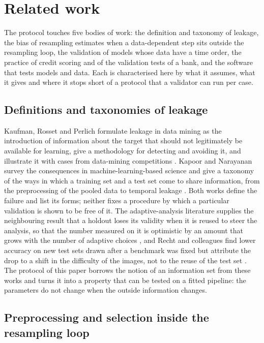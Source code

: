 \section{Related work}
\label{sec:related-work}

The protocol touches five bodies of work: the definition and taxonomy of leakage, the bias of resampling estimates when a data-dependent step sits outside the resampling loop, the validation of models whose data have a time order, the practice of credit scoring and of the validation tests of a bank, and the software that tests models and data. Each is characterised here by what it assumes, what it gives and where it stops short of a protocol that a validator can run per case.

\subsection{Definitions and taxonomies of leakage}

Kaufman, Rosset and Perlich formulate leakage in data mining as the introduction of information about the target that should not legitimately be available for learning, give a methodology for detecting and avoiding it, and illustrate it with cases from data-mining competitions \citep{kaufman2012}. Kapoor and Narayanan survey the consequences in machine-learning-based science and give a taxonomy of the ways in which a training set and a test set come to share information, from the preprocessing of the pooled data to temporal leakage \citep{kapoor2023}. Both works define the failure and list its forms; neither fixes a procedure by which a particular validation is shown to be free of it. The adaptive-analysis literature supplies the neighbouring result that a holdout loses its validity when it is reused to steer the analysis, so that the number measured on it is optimistic by an amount that grows with the number of adaptive choices \citep{dwork2015,blum2015}, and Recht and colleagues find lower accuracy on new test sets drawn after a benchmark was fixed but attribute the drop to a shift in the difficulty of the images, not to the reuse of the test set \citep{recht2019}. The protocol of this paper borrows the notion of an information set from these works and turns it into a property that can be tested on a fitted pipeline: the parameters do not change when the outside information changes.

\subsection{Preprocessing and selection inside the resampling loop}


